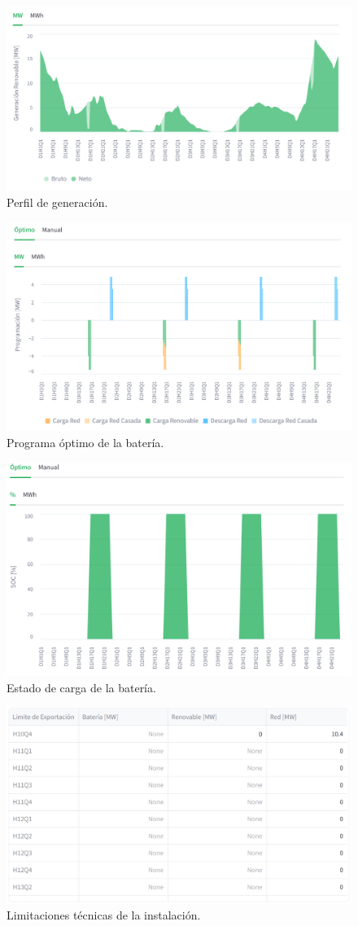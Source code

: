 \begin{figure}
  \centering
  \includegraphics[width=0.75\linewidth]{figures/perfil-generacion.png}
  \caption{Perfil de generación.}
  \label{fig:perfil-generacion}
\end{figure}

\begin{figure}
  \centering
  \includegraphics[width=0.75\linewidth]{figures/programa-optimo.png}
  \caption{Programa óptimo de la batería.}
  \label{fig:programa-optimo}
\end{figure}

\begin{figure}
  \centering
  \includegraphics[width=0.75\linewidth]{figures/soc-bess.png}
  \caption{Estado de carga de la batería.}
  \label{fig:soc-bess}
\end{figure}

\begin{figure}
  \centering
  \includegraphics[width=0.75\linewidth]{figures/limitaciones-tecnicas.png}
  \caption{Limitaciones técnicas de la instalación.}
  \label{fig:limitaciones-tecnicas}
\end{figure}
